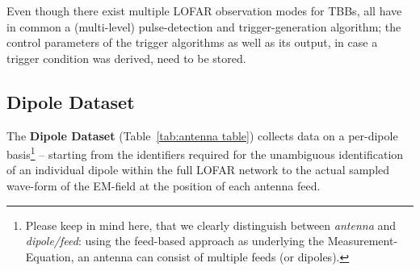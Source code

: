 \documentclass[a4paper,10pt,bibtotoc]{scrartcl}
\begin{document}
Even though there exist multiple LOFAR observation modes for TBBs, all
have in common a (multi-level) pulse-detection and trigger-generation algorithm;
the control parameters of the trigger algorithms as well as its output, in case
a trigger condition was derived, need to be stored.

\clearpage



\subsection{Dipole Dataset}
\label{sec:dipole dataset}

The \textbf{Dipole Dataset} (Table~\ref{tab:antenna table}) collects data on
a per-dipole basis\footnote{Please keep in mind here, that we clearly
  distinguish between \textsl{antenna} and \textsl{dipole/feed}: using the
  feed-based approach as underlying the Measurement-Equation, an antenna can
  consist of multiple feeds (or dipoles).} -- starting from the identifiers
required for the unambiguous identification of an individual dipole within
the full LOFAR network to the actual sampled wave-form of the EM-field at the
position of each antenna feed.
\end{document}
